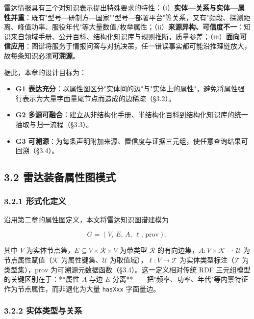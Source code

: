 \documentclass[12pt,a4paper]{ctexart}
\begin{document}
雷达情报具有三个对知识表示提出特殊要求的特性：（i）\textbf{实体—关系与实体—属性并重}：既有"型号—研制方—国家""型号—部署平台"等关系，又有"频段、探测距离、峰值功率、服役年代"等大量数值/枚举属性；（ii）\textbf{来源异构、可信度不一}：知识来自领域手册、公开百科、结构化知识库与规则推断，质量参差；（iii）\textbf{面向可信应用}：图谱将服务于情报问答与对抗决策，任一错误事实都可能沿推理链放大，故每条知识必须\textbf{可溯源}。

据此，本章的设计目标为：

\begin{itemize}[leftmargin=2em]
\item \textbf{G1 表达充分}：以属性图区分"实体间的边"与"实体上的属性"，避免将属性强行表示为大量字面量尾节点而造成的边稀疏（§3.2）。
\item \textbf{G2 多源可融合}：建立从非结构化手册、半结构化百科到结构化知识库的统一抽取与归一流程（§3.3）。
\item \textbf{G3 可溯源}：为每条声明附加来源、置信度与证据三元组，使任意查询结果可回溯（§3.4）。
\end{itemize}

\subsection*{3.2 雷达装备属性图模式}

\subsubsection*{3.2.1 形式化定义}

沿用第二章的属性图定义，本文将雷达知识图谱建模为

\[G=(V,\,E,\,A,\,\ell,\,\mathrm{prov}),\]

其中 $V$ 为实体节点集，$E\subseteq V\times\mathcal{R}\times V$ 为带类型 $\mathcal{R}$ 的有向边集，$A:V\times \mathcal{K}\rightharpoonup \mathcal{U}$ 为节点属性赋值（$\mathcal{K}$ 为属性键集、$\mathcal{U}$ 为取值域），$\ell:V\to \mathcal{T}$ 为实体类型标注（$\mathcal{T}$ 为类型集），$\mathrm{prov}$ 为可溯源元数据函数（§3.4）。这一定义相对传统 RDF 三元组模型的关键区别在于：**属性 $A$ 与边 $E$ 分离**——把"频率、功率、年代"等内禀特征作为节点属性，而非退化为大量 \texttt{hasXxx} 字面量边。

\subsubsection*{3.2.2 实体类型与关系}
\end{document}
